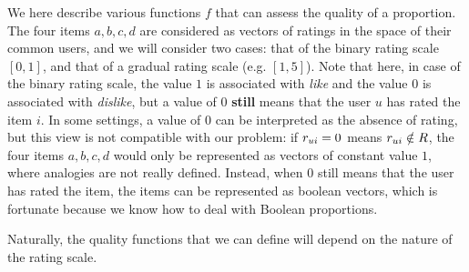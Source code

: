 We here describe various functions $f$ that can assess the quality of a
proportion. The four items $a, b, c, d$ are considered as vectors of ratings in
the space of their common users,
and we will consider two cases: that of the binary rating scale $[0, 1]$, and  
that of a gradual rating scale (e.g. $[1, 5]$). Note that here, in case of the
binary rating scale, the value $1$ is associated with \textit{like} and the
value $0$ is associated with \textit{dislike}, but a value of $0$
\textbf{still} means that the user $u$ has rated the item $i$. In some
settings, a value of $0$ can be interpreted as the absence of rating, but this
view is not compatible with our problem: if $r_{ui} = 0$ means $r_{ui} \notin R$,
the four items $a, b, c, d$ would only be represented as vectors of constant
value $1$, where analogies are not really defined. Instead, when $0$ still
means that the user has rated the item, the items can be represented as boolean
vectors, which is fortunate because we know how to deal with Boolean
proportions.

Naturally, the quality functions that we can define will depend on the nature
of the rating scale.

